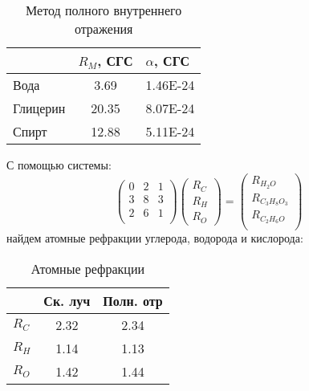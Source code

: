 \begin{table}[h!]
	\centering
	\caption{Метод полного внутреннего отражения}
	\begin{tabular}{|l|c|c|}
		\hline
		 & \multicolumn{1}{l|}{$R_M$, СГС} & \multicolumn{1}{l|}{$\alpha$, СГС} \\
		\hline
		Вода  & 3.69 & 1.46E-24 \\
		\hline
		Глицерин & 20.35 & 8.07E-24 \\
		\hline
		Спирт & 12.88 & 5.11E-24 \\
		\hline
	\end{tabular}%
	\label{tab:addlabel}%
\end{table}%

С помощью системы:
\begin{equation}
\begin{pmatrix}
0 & 2 & 1\\ 3 & 8 & 3\\2&6&1\\
\end{pmatrix}
\begin{pmatrix}
R_C\\R_H\\R_O
\end{pmatrix}
=
\begin{pmatrix}
R_{H_2O}\\
R_{C_3H_8O_3}\\
R_{C_2H_6O}\\
\end{pmatrix}
\end{equation}
найдем атомные рефракции углерода, водорода и кислорода:
\begin{table}[h!]
	\centering
	\caption{Атомные рефракции}
	\begin{tabular}{|l|c|c|}
		\hline
		& \multicolumn{1}{l|}{Ск. луч} & \multicolumn{1}{l|}{Полн. отр} \\
		\hline
		$R_C$  & 2.32 & 2.34 \\
		\hline
		$R_H$  & 1.14 & 1.13 \\
		\hline
		$R_O$  & 1.42 & 1.44 \\
		\hline
	\end{tabular}%
	\label{tab:addlabel}%
\end{table}%

